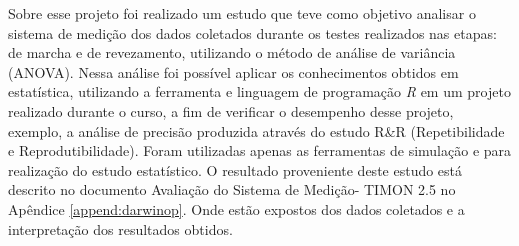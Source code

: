 Sobre esse projeto foi realizado um estudo que teve como objetivo analisar o sistema de medição dos dados coletados durante os testes realizados nas etapas: de marcha e de revezamento, utilizando o método de análise de variância (ANOVA). Nessa análise foi possível aplicar os conhecimentos obtidos em estatística, utilizando a ferramenta e linguagem de programação \textit{R} em um projeto realizado durante o curso, a fim de verificar o desempenho desse projeto, exemplo, a análise de precisão produzida através do estudo R\&R (Repetibilidade e Reprodutibilidade). Foram utilizadas apenas as ferramentas de simulação e para realização do estudo estatístico.
O resultado proveniente deste estudo está descrito no documento Avaliação do Sistema de Medição- TIMON 2.5 no Apêndice \ref{append:darwinop}. Onde estão expostos dos dados coletados e a interpretação dos resultados obtidos.







